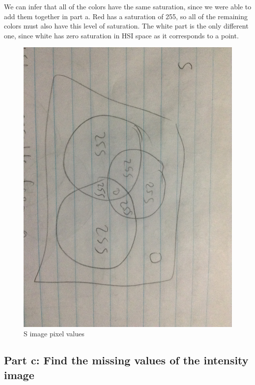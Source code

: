 \documentclass{article}
\begin{document}
	We can infer that all of the colors have the same saturation, since we were able to add them together in part a. Red has a saturation of 255, so all of the remaining colors must also have this level of saturation. The white part is the only different one, since white has zero saturation in HSI space as it corresponds to a point.
	
	\begin{figure}[H]
		\includegraphics[width=\linewidth]{6.16/fig4.JPG}
		\caption{S image pixel values}
	\end{figure}
	
	\subsection{Part c: Find the missing values of the intensity image}
	
\end{document}
